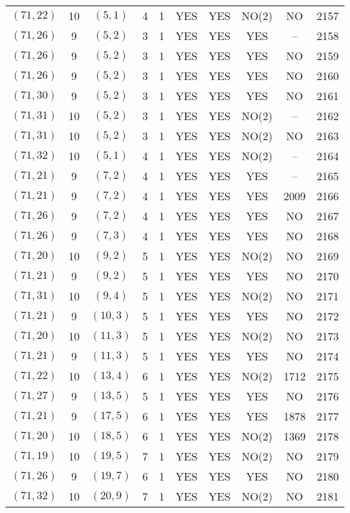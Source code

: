 \begin{longtable}{|c|c|c|c|c|c|c|c|c|c|}
$(71, 22)$ & 10 & $(5, 1)$ & 4 & 1 & YES & YES & NO(2) & NO & 2157\\
$(71, 26)$ & 9 & $(5, 2)$ & 3 & 1 & YES & YES & YES & -- & 2158\\
$(71, 26)$ & 9 & $(5, 2)$ & 3 & 1 & YES & YES & YES & NO & 2159\\
$(71, 26)$ & 9 & $(5, 2)$ & 3 & 1 & YES & YES & YES & NO & 2160\\
$(71, 30)$ & 9 & $(5, 2)$ & 3 & 1 & YES & YES & YES & NO & 2161\\
$(71, 31)$ & 10 & $(5, 2)$ & 3 & 1 & YES & YES & NO(2) & -- & 2162\\
$(71, 31)$ & 10 & $(5, 2)$ & 3 & 1 & YES & YES & NO(2) & NO & 2163\\
$(71, 32)$ & 10 & $(5, 1)$ & 4 & 1 & YES & YES & NO(2) & -- & 2164\\
$(71, 21)$ & 9 & $(7, 2)$ & 4 & 1 & YES & YES & YES & -- & 2165\\
$(71, 21)$ & 9 & $(7, 2)$ & 4 & 1 & YES & YES & YES & 2009 & 2166\\
$(71, 26)$ & 9 & $(7, 2)$ & 4 & 1 & YES & YES & YES & NO & 2167\\
$(71, 26)$ & 9 & $(7, 3)$ & 4 & 1 & YES & YES & YES & NO & 2168\\
$(71, 20)$ & 10 & $(9, 2)$ & 5 & 1 & YES & YES & NO(2) & NO & 2169\\
$(71, 21)$ & 9 & $(9, 2)$ & 5 & 1 & YES & YES & YES & NO & 2170\\
$(71, 31)$ & 10 & $(9, 4)$ & 5 & 1 & YES & YES & NO(2) & NO & 2171\\
$(71, 21)$ & 9 & $(10, 3)$ & 5 & 1 & YES & YES & YES & NO & 2172\\
$(71, 20)$ & 10 & $(11, 3)$ & 5 & 1 & YES & YES & NO(2) & NO & 2173\\
$(71, 21)$ & 9 & $(11, 3)$ & 5 & 1 & YES & YES & YES & NO & 2174\\
$(71, 22)$ & 10 & $(13, 4)$ & 6 & 1 & YES & YES & NO(2) & 1712 & 2175\\
$(71, 27)$ & 9 & $(13, 5)$ & 5 & 1 & YES & YES & YES & NO & 2176\\
$(71, 21)$ & 9 & $(17, 5)$ & 6 & 1 & YES & YES & YES & 1878 & 2177\\
$(71, 20)$ & 10 & $(18, 5)$ & 6 & 1 & YES & YES & NO(2) & 1369 & 2178\\
$(71, 19)$ & 10 & $(19, 5)$ & 7 & 1 & YES & YES & NO(2) & NO & 2179\\
$(71, 26)$ & 9 & $(19, 7)$ & 6 & 1 & YES & YES & YES & NO & 2180\\
$(71, 32)$ & 10 & $(20, 9)$ & 7 & 1 & YES & YES & NO(2) & NO & 2181\\

\end{longtable}
